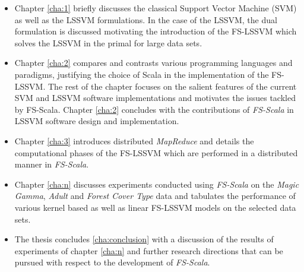 \begin{itemize}
\item Chapter \ref{cha:1} briefly discusses the classical Support Vector Machine (SVM) as well as the LSSVM formulations. In the case of the LSSVM, the dual formulation is discussed motivating the introduction of the FS-LSSVM which solves the LSSVM in the primal for large data sets.

\item Chapter \ref{cha:2} compares and contrasts various programming languages and paradigms, justifying the choice of Scala in the implementation of the FS-LSSVM. The rest of the chapter focuses on the salient features of the current SVM and LSSVM software implementations and motivates the issues tackled by FS-Scala. Chapter \ref{cha:2} concludes with the contributions of \emph{FS-Scala} in LSSVM software design and implementation.

\item Chapter \ref{cha:3} introduces distributed \emph{MapReduce} and details the computational phases of the FS-LSSVM which are performed in a distributed manner in \emph{FS-Scala}.

\item Chapter \ref{cha:n} discusses experiments conducted using \emph{FS-Scala} on the \emph{Magic Gamma}, \emph{Adult} and \emph{Forest Cover Type} data and tabulates the performance of various kernel based as well as linear FS-LSSVM models on the selected data sets.

\item The thesis concludes \ref{cha:conclusion} with a discussion of the results of experiments of chapter \ref{cha:n} and further research directions that can be pursued with respect to the development of \emph{FS-Scala}.
\end{itemize}

